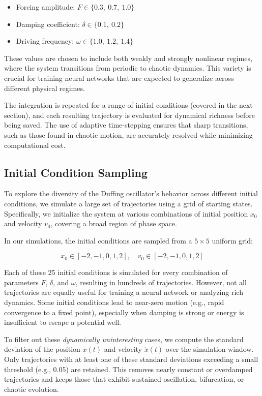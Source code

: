 \documentclass{article}
\begin{document}
\begin{itemize}
    \item Forcing amplitude: $F \in \{0.3,\ 0.7,\ 1.0\}$
    \item Damping coefficient: $\delta \in \{0.1,\ 0.2\}$
    \item Driving frequency: $\omega \in \{1.0,\ 1.2,\ 1.4\}$
\end{itemize}

These values are chosen to include both weakly and strongly nonlinear regimes, where the system transitions from periodic to chaotic dynamics. This variety is crucial for training neural networks that are expected to generalize across different physical regimes.

The integration is repeated for a range of initial conditions (covered in the next section), and each resulting trajectory is evaluated for dynamical richness before being saved. The use of adaptive time-stepping ensures that sharp transitions, such as those found in chaotic motion, are accurately resolved while minimizing computational cost.


\subsection{Initial Condition Sampling}

To explore the diversity of the Duffing oscillator's behavior across different initial conditions, we simulate a large set of trajectories using a grid of starting states. Specifically, we initialize the system at various combinations of initial position $x_0$ and velocity $v_0$, covering a broad region of phase space.

In our simulations, the initial conditions are sampled from a $5 \times 5$ uniform grid:

\begin{equation}
x_0 \in [-2, -1, 0, 1, 2], \quad v_0 \in [-2, -1, 0, 1, 2]
\end{equation}

Each of these 25 initial conditions is simulated for every combination of parameters $F$, $\delta$, and $\omega$, resulting in hundreds of trajectories. However, not all trajectories are equally useful for training a neural network or analyzing rich dynamics. Some initial conditions lead to near-zero motion (e.g., rapid convergence to a fixed point), especially when damping is strong or energy is insufficient to escape a potential well.

To filter out these \textit{dynamically uninteresting} cases, we compute the standard deviation of the position $x(t)$ and velocity $\dot{x}(t)$ over the simulation window. Only trajectories with at least one of these standard deviations exceeding a small threshold (e.g., $0.05$) are retained. This removes nearly constant or overdamped trajectories and keeps those that exhibit sustained oscillation, bifurcation, or chaotic evolution.
\end{document}
